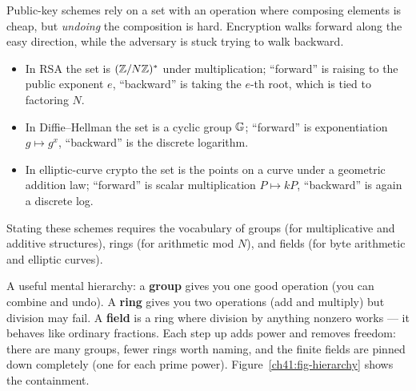 Public-key schemes rely on a set with an operation where composing elements is cheap, but \emph{undoing} the composition is hard. Encryption walks forward along the easy direction, while the adversary is stuck trying to walk backward.

\begin{itemize}
  \item In RSA the set is $(\mathbb{Z}/N\mathbb{Z})^{*}$ under multiplication; ``forward'' is raising
        to the public exponent $e$, ``backward'' is taking the $e$-th root, which
        is tied to factoring $N$.
  \item In Diffie--Hellman the set is a cyclic group $\mathbb{G}$; ``forward'' is
        exponentiation $g \mapsto g^x$, ``backward'' is the discrete logarithm.
  \item In elliptic-curve crypto the set is the points on a curve under a
        geometric addition law; ``forward'' is scalar multiplication $P \mapsto
        kP$, ``backward'' is again a discrete log.
\end{itemize}

Stating these schemes requires the vocabulary of groups (for multiplicative and additive structures), rings (for arithmetic mod $N$), and fields (for byte arithmetic and elliptic curves).

\begin{intuitionbox}
A useful mental hierarchy: a \textbf{group} gives you one good operation (you can
combine and undo). A \textbf{ring} gives you two operations (add and multiply) but
division may fail. A \textbf{field} is a ring where division by anything nonzero
works --- it behaves like ordinary fractions. Each step up adds power and removes
freedom: there are many groups, fewer rings worth naming, and the finite fields
are pinned down completely (one for each prime power).
Figure~\ref{ch41:fig-hierarchy} shows the containment.
\end{intuitionbox}

